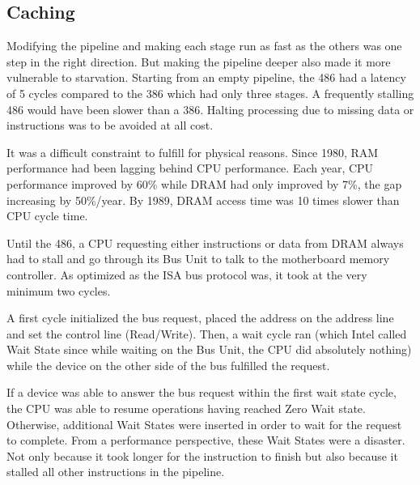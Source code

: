 \subsection{Caching }
Modifying the pipeline and making each stage run as fast as the others was one step in the right direction. But making the pipeline deeper also made it more vulnerable to starvation. Starting from an empty pipeline, the 486 had a latency of 5 cycles compared to the 386 which had only three stages. A frequently stalling 486 would have been slower than a 386. Halting processing due to missing data or instructions was to be avoided at all cost.\\
\par
It was a difficult constraint to fulfill for physical reasons. Since 1980, RAM performance had been lagging behind CPU performance. Each year, CPU performance improved by 60\% while DRAM had only improved by 7\%, the gap increasing by 50\%/year. By 1989, DRAM access time was 10 times slower than CPU cycle time.\\
\par
\vspace{2mm}
\par
Until the 486, a CPU requesting either instructions or data from DRAM always had to stall and go through its Bus Unit to talk to the motherboard memory controller. As optimized as the ISA bus protocol was, it took at the very minimum two cycles.\\
\par 
A first cycle initialized the bus request, placed the address on the address line and set the control line (Read/Write). Then, a wait cycle ran (which Intel called Wait State since while waiting on the Bus Unit, the CPU did absolutely nothing) while the device on the other side of the bus fulfilled the request.\\
\par
{}
\par
If a device was able to answer the bus request within the first wait state cycle, the CPU was able to resume operations having reached Zero Wait state. Otherwise, additional Wait States were inserted in order to wait for the request to complete. From a performance perspective, these Wait States were a disaster. Not only because it took longer for the instruction to finish but also because it stalled all other instructions in the pipeline.\\
\par
